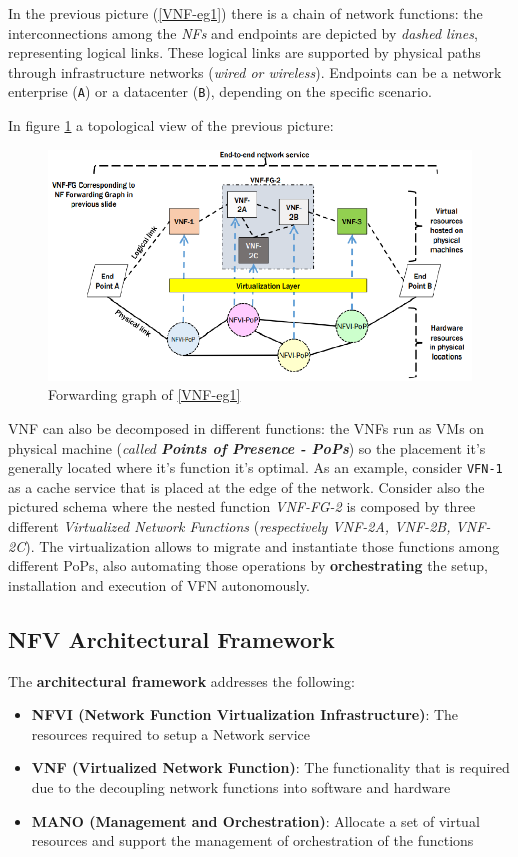 \documentclass[10pt,a4paper]{report}
\theoremstyle{definition}
\begin{document}
In the previous picture (\ref{VNF-eg1}) there is a chain of network functions: the interconnections among the \textit{NFs} and endpoints are depicted by \textit{dashed lines}, representing logical links. These logical links are supported by physical paths through infrastructure networks (\textit{wired or wireless}). Endpoints can be a network enterprise (\texttt{A}) or a datacenter (\texttt{B}), depending on the specific scenario.

In figure \ref{topological-view-eg1} a topological view of the previous picture:
\begin{figure}[h!]
	\centering\includegraphics[scale=0.50]{images/Pasted image 20230405171343.png}
	\caption{Forwarding graph of \ref{VNF-eg1}}
\label{topological-view-eg1}
\end{figure}

VNF can also be decomposed in different functions: the VNFs run as VMs on physical machine (\textit{called \textbf{Points of Presence - PoPs}}) so the placement it's generally located where it's function it's optimal. As an example, consider \texttt{VFN-1} as a cache service that is placed at the edge of the network. Consider also the pictured schema where the nested function \textit{VNF-FG-2} is composed by three different \textit{Virtualized Network Functions} (\textit{respectively VNF-2A, VNF-2B, VNF-2C}). The virtualization allows to migrate and instantiate those functions among different PoPs, also automating those operations by \textbf{orchestrating} the setup, installation and execution of VFN autonomously.
\subsection{NFV Architectural Framework}\label{sec:nfv-architectural-framework}
The \textbf{architectural framework} addresses the following:
\begin{itemize}
	\item 
	\textbf{NFVI (Network Function Virtualization Infrastructure)}: The resources required to setup a Network service
	\item 
	\textbf{VNF (Virtualized Network Function)}: The functionality that is required due to the decoupling network functions into software and hardware
	\item 
	\textbf{MANO (Management and Orchestration)}: Allocate a set of virtual resources and support the management of orchestration of the functions
\end{itemize}
\end{document}

